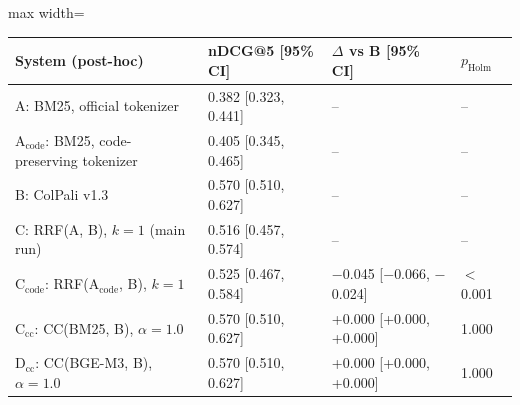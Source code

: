 \begin{adjustbox}{max width=\linewidth}
\begin{tabular}{llll}
\toprule
System (post-hoc) & nDCG@5 [95\% CI] & $\Delta$ vs B [95\% CI] & $p_\mathrm{Holm}$ \\
\midrule
A: BM25, official tokenizer & 0.382 [0.323, 0.441] & -- & -- \\
A$_\text{code}$: BM25, code-preserving tokenizer & 0.405 [0.345, 0.465] & -- & -- \\
B: ColPali v1.3 & 0.570 [0.510, 0.627] & -- & -- \\
C: RRF(A, B), $k{=}1$ (main run) & 0.516 [0.457, 0.574] & -- & -- \\
C$_\text{code}$: RRF(A$_\text{code}$, B), $k{=}1$ & 0.525 [0.467, 0.584] & $-$0.045 [$-$0.066, $-$0.024] & $<$0.001 \\
C$_\text{cc}$: CC(BM25, B), $\alpha{=}1.0$ & 0.570 [0.510, 0.627] & +0.000 [+0.000, +0.000] & 1.000 \\
D$_\text{cc}$: CC(BGE-M3, B), $\alpha{=}1.0$ & 0.570 [0.510, 0.627] & +0.000 [+0.000, +0.000] & 1.000 \\
\bottomrule
\end{tabular}
\end{adjustbox}
\par{}
